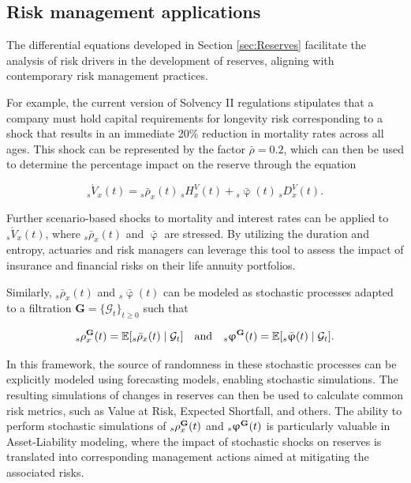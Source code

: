 \documentclass[12pt]{article}
\begin{document}
\subsection{Risk management applications}

The differential equations developed in Section \ref{sec:Reserves} facilitate the analysis of risk drivers in the development of reserves, aligning with contemporary risk management practices.

For example, the current version of Solvency II regulations stipulates that a company must hold capital requirements for longevity risk corresponding to a shock that results in an immediate 20\% reduction in mortality rates across all ages. This shock can be represented by the factor \( \bar{\rho} = 0.2 \), which can then be used to determine the percentage impact on the reserve through the equation 

\[
{}_s\acute{V}_x(t) = {}_s\bar{\rho}_x(t) \, {}_sH_x^V(t) + {}_s\bar{\upvarphi}(t) \, {}_sD_x^V(t).
\]

Further scenario-based shocks to mortality and interest rates can be applied to \( {}_s\acute{V}_x(t) \), where \( {}_s\bar{\rho}_x(t) \) and \( \bar{\upvarphi} \) are stressed. By utilizing the duration and entropy, actuaries and risk managers can leverage this tool to assess the impact of insurance and financial risks on their life annuity portfolios.

Similarly, \( {}_s\bar{\rho}_x(t) \) and \( {}_s\bar{\upvarphi}(t) \) can be modeled as stochastic processes adapted to a filtration \( \textbf{G} = \{\mathcal{G}_t\}_{t \ge 0} \) such that 

\[
{}_s{\rho}^{\bf{G}}_x(t) = \mathbb{E}[{}_s\bar{\rho}_x(t) \mid \mathcal{G}_t] \quad \text{and} \quad {}_s{\upvarphi}^{\bf{G}}(t) = \mathbb{E}[{}_s\bar{\upvarphi}(t) \mid \mathcal{G}_t].
\]

In this framework, the source of randomness in these stochastic processes can be explicitly modeled using forecasting models, enabling stochastic simulations. The resulting simulations of changes in reserves can then be used to calculate common risk metrics, such as Value at Risk, Expected Shortfall, and others. The ability to perform stochastic simulations of \( {}_s{\rho}^{\bf{G}}_x(t) \) and \( {}_s{\upvarphi}^{\bf{G}}(t) \) is particularly valuable in Asset-Liability modeling, where the impact of stochastic shocks on reserves is translated into corresponding management actions aimed at mitigating the associated risks.
\end{document}
